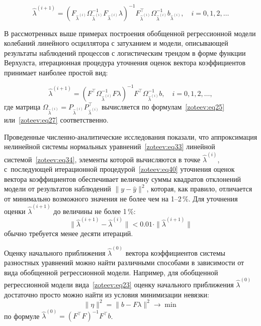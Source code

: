 \begin{equation}
\hat{\lambda}^{(i+1)}=(F_{\hat{\lambda}^{(i)}}\Omega_{\hat{\lambda}^{(i)}}^{-1}F_{\hat{\lambda}^{(i)}}\lambda)^{-1}F_{\hat{\lambda}^{(i)}}^{\top}\Omega_{\hat{\lambda}^{(i)}}^{-1}b_{\hat{\lambda}^{(i)}}, \quad i=0,1,2,\dots
\label{zoteev:eq39}
\end{equation}

В рассмотренных выше примерах построения обобщенной регрессионной модели колебаний линейного осциллятора с затуханием и модели, описывающей результаты наблюдений процессов с логистическим трендом в форме функции Верхулста, итерационная процедура уточнения оценок вектора коэффициентов  принимает наиболее простой вид:

\begin{equation}
\hat{\lambda}^{(i+1)}=(F^{\top}\Omega_{\hat{\lambda}^{(i)}}^{-1}F\lambda)^{-1}F^{\top}\Omega_{\hat{\lambda}^{(i)}}^{-1}b, \quad i=0,1,2,\dots,
\label{zoteev:eq40}
\end{equation}
где матрица $\Omega_{\hat{\lambda}^{(i)}}=P_{\hat{\lambda}^{(i)}}P_{\hat{\lambda}^{(i)}}^{\top}$ вычисляется по формулам~\eqref{zoteev:eq25} или~\eqref{zoteev:eq27} соответственно.


Проведенные численно-аналитические исследования показали, что аппроксимация нелинейной системы нормальных уравнений~\eqref{zoteev:eq33} линейной системой~\eqref{zoteev:eq34}, элементы которой вычисляются в точке $\hat{\lambda}^{(i)}$, с~последующей итерационной процедурой~\eqref{zoteev:eq40} уточнения оценок %
вектора коэффициентов обеспечивает величину суммы квадратов отклонений модели от результатов наблюдений $\|y-\hat{y}\|^2$, которая, как правило, отличается от минимально возможного значения не более чем на 1--2\,\%. 
Для уточнения оценки $\hat{\lambda}^{(i+1)}$ до величины не более 1\,\%: 
$$
\|\hat{\lambda}^{(i+1)}-\hat{\lambda}^{(i)}\|<0.01 \cdot \|\hat{\lambda}^{(i+1)}
\|
$$ обычно требуется менее десяти итераций. 

Оценку начального приближения $\hat{\lambda}^{(0)}$ вектора коэффициентов системы разностных уравнений можно найти различными способами в зависимости от вида обобщенной регрессионной модели. Например, для обобщенной регрессионной модели вида~\eqref{zoteev:eq23} оценку начального приближения $\hat{\lambda}^{(0)}$ достаточно просто можно найти из условия минимизации невязки: $$\|\eta\|^2=\|b-F\lambda\|^2 \to \min$$  
по формуле $\hat{\lambda}^{(0)}=(F^{\top}F)^{-1}F^{\top}b$.

